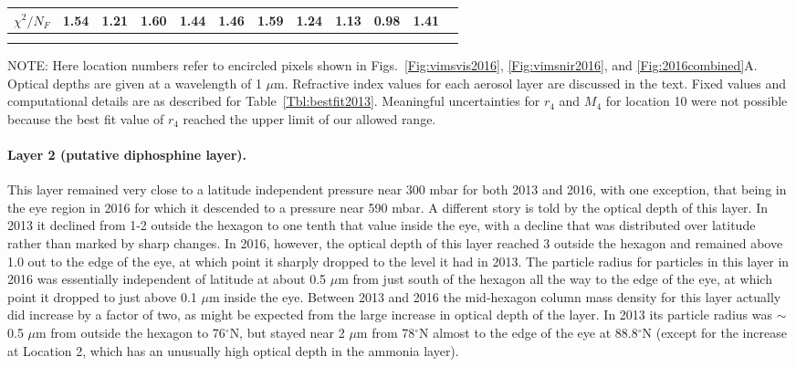 \documentclass[article,11pt]{emulateapj}
\def\degx{$^\circ$}
\def\mum{$\mu$m }
\def\mumx{$\mu$m}
\begin{document}
\begin{table*}[!htb]
\begin{scriptsize}
\begin{tabular}{l l l l l l l l l l l l}
$\chi^2/N_F$ &   1.54 &   1.21 &   1.60 &   1.44 &   1.46 &   1.59 &   1.24 &   1.13 &   0.98 &   1.41\\[0.05in]
\hline\\[-0.1in]
\label{Tbl:bestfit2016}
\end{tabular}
\end{scriptsize}
\begin{small}
\parbox[c]{6in}{NOTE: Here location numbers refer to encircled pixels
  shown in Figs.\ \ref{Fig:vimsvis2016}, \ref{Fig:vimsnir2016}, and
  \ref{Fig:2016combined}A. Optical depths are given at a wavelength of
  1 \mumx. Refractive index values for each aerosol layer are
  discussed in the text.  Fixed values and computational details are
  as described for Table\ \ref{Tbl:bestfit2013}. Meaningful uncertainties
for $r_4$ and $M_4$ for location 10 were not possible because the best fit value of
$r_4$ reached the upper limit of our allowed range.}
\end{small}
\end{table*}

\paragraph{Layer 2 (putative diphosphine layer).}  This layer remained
very close to a latitude independent pressure near 300 mbar for both
2013 and 2016, with one exception, that being in the eye region in
2016 for which it descended to a pressure near 590 mbar.  A different
story is told by the optical depth of this layer.  In 2013 it
 declined from 1-2 outside the hexagon to one tenth that value
 inside the eye, with a decline that was distributed over latitude
rather than marked by sharp changes.  In 2016, however, the optical
depth of this layer reached 3 outside the hexagon and remained
above 1.0 out to the edge of the eye, at which point it
sharply dropped to the level it had in 2013. The particle 
radius for particles in this layer in 2016 was essentially independent
of latitude at about 0.5 \mum from just south of the hexagon
all the way to the edge of the eye, at which point it
dropped to just above 0.1 \mum inside the eye.  Between
2013 and 2016 the mid-hexagon column mass density for this
layer actually did increase by a factor of two, as might be
expected from the large increase in optical depth of the layer.  In 2013
its particle radius was $\sim$0.5 \mum from outside the hexagon to 76\degx N,
but stayed near 2 \mum from 78\degx N almost to the edge of the eye
at 88.8\degx N (except for the increase at Location 2, which has
an unusually high optical depth in the ammonia layer).
\end{document}
